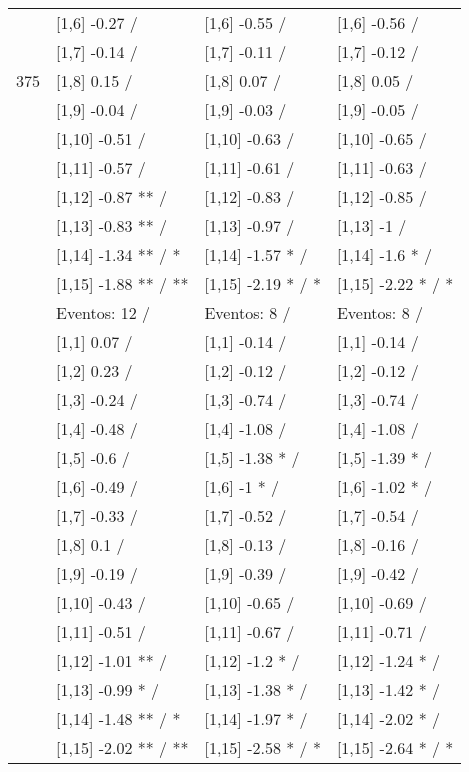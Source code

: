 \begin{table}
\begin{tabular}[t]{llll}
 & {}[1,6] -0.27  / & {}[1,6] -0.55  / & {}[1,6] -0.56  /\\
 & {}[1,7] -0.14  / & {}[1,7] -0.11  / & {}[1,7] -0.12  /\\
375 & {}[1,8] 0.15  / & {}[1,8] 0.07  / & {}[1,8] 0.05  /\\
\addlinespace
 & {}[1,9] -0.04  / & {}[1,9] -0.03  / & {}[1,9] -0.05  /\\
 & {}[1,10] -0.51  / & {}[1,10] -0.63  / & {}[1,10] -0.65  /\\
 & {}[1,11] -0.57  / & {}[1,11] -0.61  / & {}[1,11] -0.63  /\\
 & {}[1,12] -0.87 ** / & {}[1,12] -0.83  / & {}[1,12] -0.85  /\\
 & {}[1,13] -0.83 ** / & {}[1,13] -0.97  / & {}[1,13] -1  /\\
\addlinespace
 & {}[1,14] -1.34 ** / * & {}[1,14] -1.57 * / & {}[1,14] -1.6 * /\\
 & {}[1,15] -1.88 ** / ** & {}[1,15] -2.19 * / * & {}[1,15] -2.22 * / *\\
 & Eventos:  12 / & Eventos:  8 / & Eventos:  8 /\\
 & {}[1,1] 0.07  / & {}[1,1] -0.14  / & {}[1,1] -0.14  /\\
 & {}[1,2] 0.23  / & {}[1,2] -0.12  / & {}[1,2] -0.12  /\\
\addlinespace
 & {}[1,3] -0.24  / & {}[1,3] -0.74  / & {}[1,3] -0.74  /\\
 & {}[1,4] -0.48  / & {}[1,4] -1.08  / & {}[1,4] -1.08  /\\
 & {}[1,5] -0.6  / & {}[1,5] -1.38 * / & {}[1,5] -1.39 * /\\
 & {}[1,6] -0.49  / & {}[1,6] -1 * / & {}[1,6] -1.02 * /\\
 & {}[1,7] -0.33  / & {}[1,7] -0.52  / & {}[1,7] -0.54  /\\
\addlinespace
500 & {}[1,8] 0.1  / & {}[1,8] -0.13  / & {}[1,8] -0.16  /\\
 & {}[1,9] -0.19  / & {}[1,9] -0.39  / & {}[1,9] -0.42  /\\
 & {}[1,10] -0.43  / & {}[1,10] -0.65  / & {}[1,10] -0.69  /\\
 & {}[1,11] -0.51  / & {}[1,11] -0.67  / & {}[1,11] -0.71  /\\
 & {}[1,12] -1.01 ** / & {}[1,12] -1.2 * / & {}[1,12] -1.24 * /\\
\addlinespace
 & {}[1,13] -0.99 * / & {}[1,13] -1.38 * / & {}[1,13] -1.42 * /\\
 & {}[1,14] -1.48 ** / * & {}[1,14] -1.97 * / & {}[1,14] -2.02 * /\\
 & {}[1,15] -2.02 ** / ** & {}[1,15] -2.58 * / * & {}[1,15] -2.64 * / *\\
\bottomrule
\end{tabular}
\end{table}
